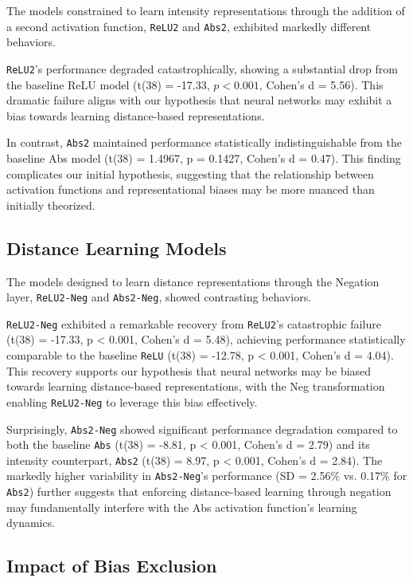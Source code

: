 The models constrained to learn intensity representations through the addition of a second activation function, \texttt{ReLU2} and \texttt{Abs2}, exhibited markedly different behaviors. 

\texttt{ReLU2}'s performance degraded catastrophically, showing a substantial drop from the baseline ReLU model (t(38) = -17.33, $p < 0.001$, Cohen's d = 5.56). This dramatic failure aligns with our hypothesis that neural networks may exhibit a bias towards learning distance-based representations. 

In contrast, \texttt{Abs2} maintained performance statistically indistinguishable from the baseline Abs model (t(38) = 1.4967, p = 0.1427, Cohen's d = 0.47). This finding complicates our initial hypothesis, suggesting that the relationship between activation functions and representational biases may be more nuanced than initially theorized.

\subsection{Distance Learning Models}

The models designed to learn distance representations through the Negation layer, \texttt{ReLU2-Neg} and \texttt{Abs2-Neg}, showed contrasting behaviors.

\texttt{ReLU2-Neg} exhibited a remarkable recovery from \texttt{ReLU2}'s catastrophic failure (t(38) = -17.33, p < 0.001, Cohen's d = 5.48), achieving performance statistically comparable to the baseline \texttt{ReLU} (t(38) = -12.78, p < 0.001, Cohen's d = 4.04). This recovery supports our hypothesis that neural networks may be biased towards learning distance-based representations, with the Neg transformation enabling \texttt{ReLU2-Neg} to leverage this bias effectively.

Surprisingly, \texttt{Abs2-Neg} showed significant performance degradation compared to both the baseline \texttt{Abs} (t(38) = -8.81, p < 0.001, Cohen's d = 2.79) and its intensity counterpart, \texttt{Abs2} (t(38) = 8.97, p < 0.001, Cohen's d = 2.84). The markedly higher variability in \texttt{Abs2-Neg}'s performance (SD = 2.56\% vs. 0.17\% for \texttt{Abs2}) further suggests that enforcing distance-based learning through negation may fundamentally interfere with the Abs activation function's learning dynamics.

\subsection{Impact of Bias Exclusion}

